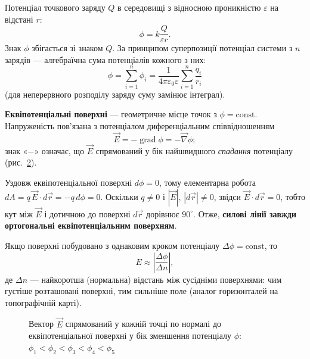 \begin{figure}[h!]
\centering

  \caption{}\label{tikz:AdU}
\end{figure}

Потенціал точкового заряду $Q$ в середовищі з відносною проникністю $\varepsilon$ на відстані $r$:
\begin{equation}
\phi = k\frac{Q}{\varepsilon r} .
\end{equation}
Знак $\phi$ збігається зі знаком $Q$. За принципом суперпозиції потенціал системи з $n$ зарядів — алгебраїчна сума потенціалів кожного з них:
\begin{equation}
\phi = \sum_{i=1}^{n}\phi_i = \frac{1}{4\pi\varepsilon_0\varepsilon}\sum_{i=1}^n\frac{q_i}{r_i}
\end{equation}
(для неперервного розподілу заряду суму замінює інтеграл).

\textbf{Еквіпотенціальні поверхні} --- геометричне місце точок з $\phi=\text{const}$. Напруженість пов'язана з потенціалом диференціальним співвідношенням
\begin{equation}
\vec{E} = -\operatorname{grad}\phi = -\vec{\nabla}\phi;
\end{equation}
знак «$-$» означає, що $\vec E$ спрямований у бік найшвидшого \emph{спадання} потенціалу (рис.~\ref{tikz:eq_surf}).

Уздовж еквіпотенціальної поверхні $d\phi=0$, тому елементарна робота $dA = q\,\vec E\cdot d\vec r = -q\,d\phi=0$. Оскільки $q\neq0$ і $|\vec E|,\,|d\vec r|\neq0$, звідси $\vec E\cdot d\vec r=0$, тобто кут між $\vec E$ і дотичною до поверхні $d\vec r$ дорівнює $90^\circ$. Отже, \textbf{силові лінії завжди ортогональні еквіпотенціальним поверхням}.

Якщо поверхні побудовано з однаковим кроком потенціалу $\Delta\phi=\text{const}$, то
\begin{equation}
E \approx \left| \frac{\Delta\phi}{\Delta n} \right|,
\end{equation}
де $\Delta n$ --- найкоротша (нормальна) відстань між сусідніми поверхнями: чим густіше розташовані поверхні, тим сильніше поле (аналог горизонталей на топографічній карті).

\begin{figure}[h!]
\centering

  \caption{Вектор $\vec{E}$ спрямований у кожній точці по нормалі до
					еквіпотенціальної поверхні у бік зменшення потенціалу $\phi$:
					$
						\phi_1 < \phi_2 < \phi_3 < \phi_4 < \phi_5
					$
}
\label{tikz:eq_surf}
\end{figure}

